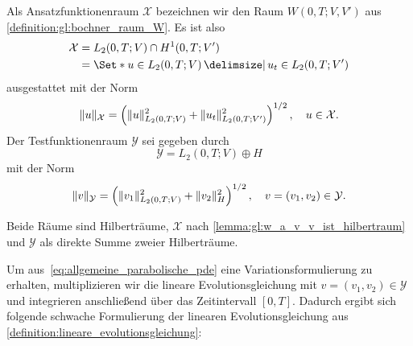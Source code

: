 \begin{Definition}
\label{definition:gl:ansatz_und_testraum}
    Als Ansatzfunktionenraum $\mathcal X$ bezeichnen wir den Raum $W(0, T; V, V')$ aus \cref{definition:gl:bochner_raum_W}.
    Es ist also
    \begin{equation}
        \label{eq:var_all_ansatzraum_x}
        \begin{aligned}
            \mathcal X &= L_{2}(0, T; V) \cap H^{1}(0, T; V')
            \\&= \Set*{ u \in L_{2}(0, T; V) \given u_{t} \in L_{2}(0, T; V') }
        \end{aligned}
    \end{equation}
    ausgestattet mit der Norm
    \begin{equation}
        \label{eq:var_all_ansatzraum_x_norm}
        \lVert u\rVert_{\mathcal X} = \left( \lVert u\rVert_{L_{2}{(0, T; V)}}^{2} + \lVert u_{t}\rVert_{L_{2}{(0, T; V')}}^{2} \right)^{1 / 2}, \quad u \in \mathcal X.
    \end{equation}
    Der Testfunktionenraum $\mathcal Y$ sei gegeben durch
    \begin{equation}
        \label{eq:var_all_testraum_y}
        \mathcal Y = L_{2}(0, T; V) \oplus H
    \end{equation}
    mit der Norm
    \begin{equation}
        \label{eq:var_all_testraum_y_norm}
        \lVert v\rVert_{\mathcal Y} = \left( \lVert v_{1}\rVert_{L_{2}(0, T; V)}^{2} + \lVert v_{2}\rVert_{H}^{2} \right)^{1 / 2}, \quad v = (v_{1}, v_{2}) \in \mathcal Y.
    \end{equation}
\end{Definition}

Beide Räume sind Hilberträume, $\mathcal X$ nach \cref{lemma:gl:w_a_v_v_ist_hilbertraum} und $\mathcal Y$ als direkte Summe zweier Hilberträume.

Um aus~\cref{eq:allgemeine_parabolische_pde} eine Variationsformulierung zu erhalten, multiplizieren wir die lineare Evolutionsgleichung mit $v = (v_{1}, v_{2}) \in \mathcal Y$ und integrieren anschließend über das Zeitintervall $[0, T]$.
Dadurch ergibt sich folgende schwache Formulierung der linearen Evolutionsgleichung aus \cref{definition:lineare_evolutionsgleichung}:

